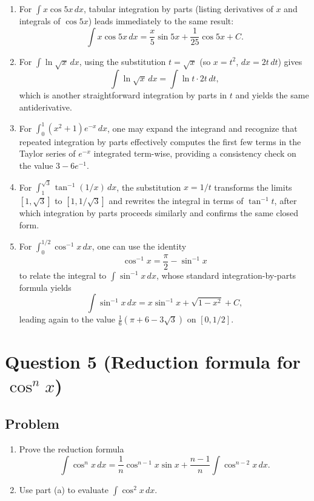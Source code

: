 \documentclass[12pt]{article}
\begin{document}
\begin{enumerate}[label=(\alph*)]
\item For \(\int x\cos 5x\,dx\), tabular integration by parts (listing derivatives of \(x\) and integrals of \(\cos 5x\)) leads immediately to the same result:
\[
\int x\cos 5x\,dx = \frac{x}{5}\sin 5x + \frac{1}{25}\cos 5x + C.
\]

\item For \(\int \ln\sqrt{x}\,dx\), using the substitution \(t=\sqrt{x}\) (so \(x=t^{2}\), \(dx=2t\,dt\)) gives
\[
\int \ln\sqrt{x}\,dx
= \int \ln t\cdot 2t\,dt,
\]
which is another straightforward integration by parts in \(t\) and yields the same antiderivative.

\item For \(\int_{0}^{1}(x^{2}+1)e^{-x}\,dx\), one may expand the integrand and recognize that repeated integration by parts effectively computes the first few terms in the Taylor series of \(e^{-x}\) integrated term-wise, providing a consistency check on the value \(3-6e^{-1}\).

\item For \(\int_{1}^{\sqrt{3}}\tan^{-1}(1/x)\,dx\), the substitution \(x=1/t\) transforms the limits \([1,\sqrt{3}]\) to \([1,1/\sqrt{3}]\) and rewrites the integral in terms of \(\tan^{-1} t\), after which integration by parts proceeds similarly and confirms the same closed form.

\item For \(\int_{0}^{1/2}\cos^{-1} x\,dx\), one can use the identity
\[
\cos^{-1}x = \frac{\pi}{2}-\sin^{-1}x
\]
to relate the integral to \(\int \sin^{-1}x\,dx\), whose standard integration-by-parts formula yields
\[
\int \sin^{-1}x\,dx = x\sin^{-1}x + \sqrt{1-x^{2}}+C,
\]
leading again to the value \(\frac{1}{6}(\pi+6-3\sqrt{3})\) on \([0,1/2]\).
\end{enumerate}

\newpage


\section*{Question 5 (Reduction formula for \(\cos^{n}x\))}

\subsection*{Problem}
\begin{enumerate}[label=(\alph*)]
\item Prove the reduction formula
\[
\int \cos^{n}x\,dx
= \frac{1}{n}\cos^{n-1}x\sin x
+ \frac{n-1}{n}\int \cos^{n-2}x\,dx.
\]
\item Use part (a) to evaluate \(\displaystyle \int \cos^{2}x\,dx\).
\end{enumerate}
\end{document}
